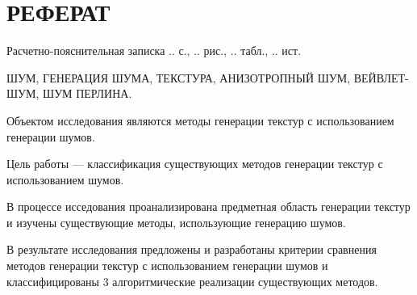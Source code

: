 \chapter*{РЕФЕРАТ}

Расчетно-пояснительная записка .. с., .. рис., .. табл., .. ист.

ШУМ, ГЕНЕРАЦИЯ ШУМА, ТЕКСТУРА, АНИЗОТРОПНЫЙ ШУМ, ВЕЙВЛЕТ-ШУМ, ШУМ ПЕРЛИНА.

Объектом исследования являются методы генерации текстур с использованием генерации шумов.

Цель работы --- классификация существующих методов генерации текстур с использованием шумов.

В процессе исседования проанализирована предметная область генерации текстур и изучены существующие методы, использующие генерацию шумов.

В результате исследования предложены и разработаны критерии сравнения методов генерации текстур с использованием генерации шумов и классифицированы 3 алгоритмические реализации существующих методов.